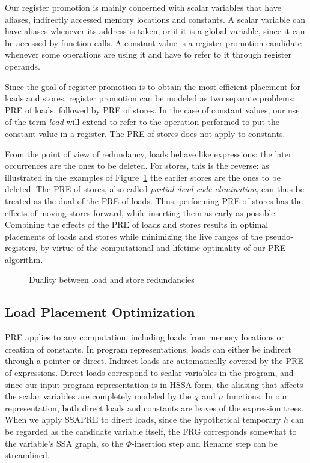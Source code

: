 Our register promotion is mainly concerned with scalar variables that have aliases, indirectly accessed memory locations and constants. 
A scalar variable can have aliases whenever its address is taken, or if it is a global variable, since it can be accessed by function calls. 
A constant value is a register promotion candidate whenever some operations are using it and have to refer to it through register operands. 

Since the goal of register promotion is to obtain the most efficient placement for loads and stores, register promotion can be modeled as two separate problems: 
PRE of loads, followed by PRE of stores. 
In the case of constant values, our use of the term \emph{load} will extend to refer to the operation performed to put the constant value in a register. 
The PRE of stores does not apply to constants.

From the point of view of redundancy, loads behave like expressions: 
the later occurrences are the ones to be deleted. 
For stores, this is the reverse: 
as illustrated in the examples of Figure~\ref{fig:load-store-dual} the earlier stores are the ones to be deleted. 
The PRE of stores, also called \emph{partial dead code elimination}, can thus be treated as the dual of the PRE of loads. 
Thus, performing PRE of stores has the effects of moving stores forward, while inserting them as early as possible. 
Combining the effects of the PRE of loads and stores results in optimal placements of loads and stores while minimizing the live ranges of the pseudo-registers, by virtue of the computational and lifetime optimality of our PRE algorithm.

\begin{figure}
\centering
\hfill
{}
\caption{Duality between load and store redundancies}
\label{fig:load-store-dual}
\end{figure}

\subsection{Load Placement Optimization}
PRE applies to any computation, including loads from memory locations or creation of constants. 
In program representations, loads can either be indirect through a pointer or direct. 
Indirect loads are automatically covered by the PRE of expressions. 
Direct loads correspond to scalar variables in the program, and since our input program representation is in HSSA form, the aliasing that affects the scalar variables are completely modeled by the $\chi$ and $\mu$ functions. 
In our representation, both direct loads and constants are leaves of the expression trees. 
When we apply SSAPRE to direct loads, since the hypothetical temporary $h$ can be regarded as the candidate variable itself, the FRG corresponds somewhat to the variable's SSA graph, so the $\Phi$-insertion step and Rename step can be streamlined.

